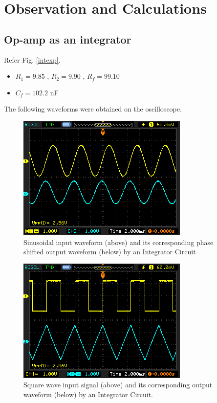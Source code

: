 \section{Observation and Calculations}

\subsection{Op-amp as an integrator}
    
Refer Fig. \ref{intexp}.

    \begin{itemize}
        \item $R_1 = 9.85$ \kohm, $R_2 = 9.90$ \kohm, $R_f = 99.10$ \kohm
        \item $C_f = 102.2$ nF\\
    \end{itemize}

    The following waveforms were obtained on the oscilloscope.

    \begin{figure}[H]
        \centering
        \includegraphics[width=0.75\columnwidth]{images/int5.png}
        \caption{Sinusoidal input waveform (above) and its corresponding phase shifted output waveform (below) by an Integrator Circuit}
        \label{int1}
    \end{figure}

    \begin{figure}[H]
        \centering
        \includegraphics[width=0.75\columnwidth]{images/int2.png}
        \caption{Square wave input signal (above) and its corresponding output waveform (below) by an Integrator Circuit.}
        \label{int2}
    \end{figure}

